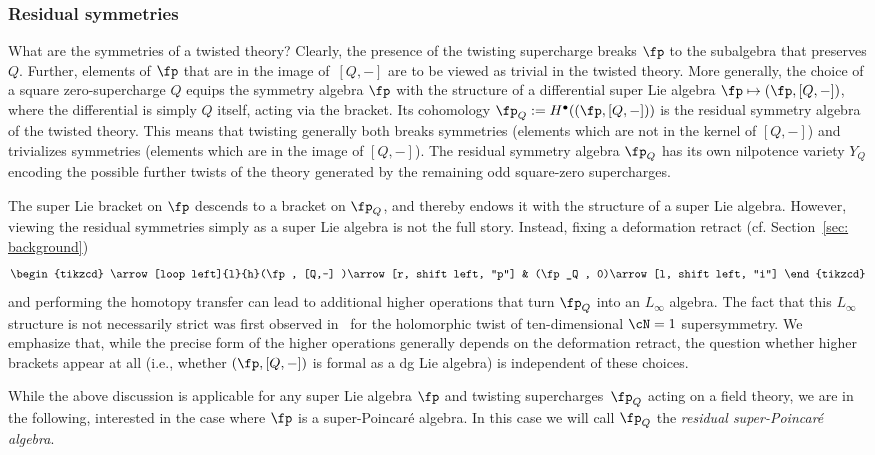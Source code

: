 \documentclass[pdftex]{sigma}
\numberwithin{equation}{section}
\theoremstyle{definition}
\begin{document}
\subsubsection{Residual symmetries}
What are the symmetries of a twisted theory? Clearly, the presence of the twisting supercharge breaks $\fp$ to the subalgebra that preserves $Q$. Further, elements of $\fp$ that are in the image of~${[Q,-]}$ are to be viewed as trivial in the twisted theory. More generally, the choice of a square zero-supercharge $Q$ equips the symmetry algebra $\fp$ with the structure of a differential super Lie algebra
$
 \fp \mapsto (\fp, [Q,-])$,
where the differential is simply $Q$ itself, acting via the bracket.
Its cohomology $\fp_Q := H^\bullet((\fp ,[Q,-]))$ is the residual symmetry algebra of the twisted theory. This means that twisting generally both breaks symmetries (elements which are not in the kernel of $[Q,-]$) and trivializes symmetries (elements which are in the image of $[Q,-]$). The residual symmetry algebra $\fp_Q$ has its own nilpotence variety $Y_{Q}$ encoding the possible further twists of the theory generated by the remaining odd square-zero supercharges.

The super Lie bracket on $\fp$ descends to a bracket on $\fp_Q$, and thereby endows it with the structure of a super Lie algebra. However, viewing the residual symmetries simply as a super Lie algebra is not the full story. Instead, fixing a deformation retract (cf. Section~\ref{sec: background})
\[
	\begin{tikzcd}
	\arrow[loop left]{l}{h}(\fp , [Q,-] )\arrow[r, shift left, "p"] & (\fp_Q , 0)\arrow[l, shift left, "i"]
	\end{tikzcd}
\]
and performing the homotopy transfer can lead to additional higher operations that turn $\fp_Q$ into an $L_\infty$ algebra. The fact that this $L_\infty$ structure is not necessarily strict was first observed in~\cite{JKY} for the holomorphic twist of ten-dimensional $\cN=1$ supersymmetry.
We emphasize that, while the precise form of the higher operations generally depends on the deformation retract, the question whether higher brackets appear at all (i.e., whether $(\fp, [Q,-])$ is formal as a dg Lie algebra) is independent of these choices.

While the above discussion is applicable for any super Lie algebra $\fp$ and twisting supercharges~$\fp_Q$ acting on a field theory, we are in the following, interested in the case where $\fp$ is a super-Poincar\'e algebra. In this case we will call $\fp_Q$ the \emph{residual super-Poincar\'e algebra}.
\end{document}
